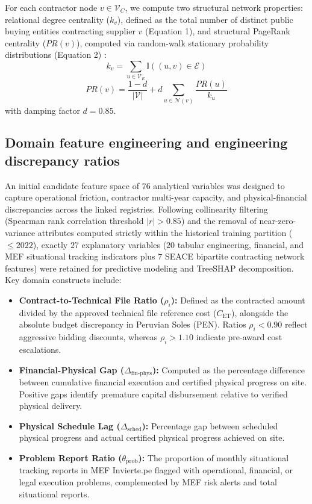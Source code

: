 \documentclass[10pt,a4paper]{article}
\begin{document}
For each contractor node $v \in \mathcal{V}_C$, we compute two structural network properties: relational degree centrality ($k_v$), defined as the total number of distinct public buying entities contracting supplier $v$ (Equation 1), and structural PageRank centrality ($PR(v)$), computed via random-walk stationary probability distributions (Equation 2) \citep{page1999pagerank, newman2003structure}:
\begin{equation}
    k_v = \sum_{u \in \mathcal{V}_E} \mathbb{I}((u, v) \in \mathcal{E})
\end{equation}
\begin{equation}
    PR(v) = \frac{1 - d}{|\mathcal{V}|} + d \sum_{u \in \mathcal{N}(v)} \frac{PR(u)}{k_u}
\end{equation}
with damping factor $d = 0.85$.

\subsection*{Domain feature engineering and engineering discrepancy ratios}
An initial candidate feature space of $76$ analytical variables was designed to capture operational friction, contractor multi-year capacity, and physical-financial discrepancies across the linked registries. Following collinearity filtering (Spearman rank correlation threshold $|r| > 0.85$) and the removal of near-zero-variance attributes computed strictly within the historical training partition ($\le 2022$), exactly $27$ explanatory variables ($20$ tabular engineering, financial, and MEF situational tracking indicators plus $7$ SEACE bipartite contracting network features) were retained for predictive modeling and TreeSHAP decomposition. Key domain constructs include:
\begin{itemize}
    \item \textbf{Contract-to-Technical File Ratio ($\rho_i$):} Defined as the contracted amount divided by the approved technical file reference cost ($C_{\text{ET}}$), alongside the absolute budget discrepancy in Peruvian Soles (PEN). Ratios $\rho_i < 0.90$ reflect aggressive bidding discounts, whereas $\rho_i > 1.10$ indicate pre-award cost escalations.
    \item \textbf{Financial-Physical Gap ($\Delta_{\text{fin-phys}}$):} Computed as the percentage difference between cumulative financial execution and certified physical progress on site. Positive gaps identify premature capital disbursement relative to verified physical delivery.
    \item \textbf{Physical Schedule Lag ($\Delta_{\text{sched}}$):} Percentage gap between scheduled physical progress and actual certified physical progress achieved on site.
    \item \textbf{Problem Report Ratio ($\theta_{\text{prob}}$):} The proportion of monthly situational tracking reports in MEF Invierte.pe flagged with operational, financial, or legal execution problems, complemented by MEF risk alerts and total situational reports.
\end{itemize}
\end{document}
